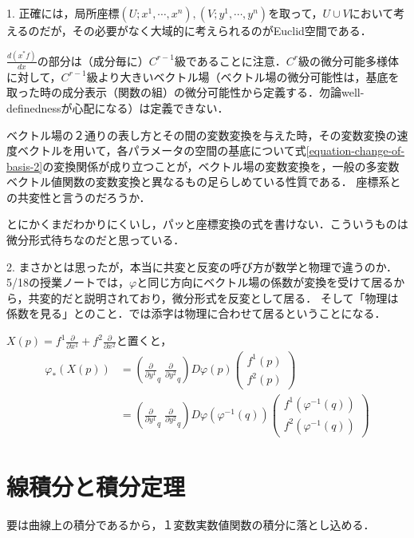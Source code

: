 \documentclass[uplatex, dvipdfmx]{jsreport}
\begin{document}
\begin{remark}
    1. 正確には，局所座標$(U;x^1,\cdots,x^n),(V;y^1,\cdots,y^n)$を取って，$U\cup V$において考えるのだが，その必要がなく大域的に考えられるのがEuclid空間である．

    $\frac{d(x^*f)}{dx}$の部分は（成分毎に）$C^{r-1}$級であることに注意．$C^r$級の微分可能多様体に対して，$C^{r-1}$級より大きいベクトル場（ベクトル場の微分可能性は，基底を取った時の成分表示（関数の組）の微分可能性から定義する．勿論well-definednessが心配になる）は定義できない．

    ベクトル場の２通りの表し方とその間の変数変換を与えた時，その変数変換の速度ベクトルを用いて，各パラメータの空間の基底について式\ref{equation-change-of-basis-2}の変換関係が成り立つことが，ベクトル場の変数変換を，一般の多変数ベクトル値関数の変数変換と異なるもの足らしめている性質である．
    座標系との共変性と言うのだろうか．

    とにかくまだわかりにくいし，パッと座標変換の式を書けない．こういうものは微分形式待ちなのだと思っている．

    2. まさかとは思ったが，本当に共変と反変の呼び方が数学と物理で違うのか．5/18の授業ノートでは，$\varphi$と同じ方向にベクトル場の係数が変換を受けて居るから，共変的だと説明されており，微分形式を反変として居る．
    そして「物理は係数を見る」とのこと．では添字は物理に合わせて居るということになる．

    $X(p)=f^1\frac{\partial}{\partial x^1}+f^2\frac{\partial}{\partial x^2}$と置くと，
    \begin{align*}
        \varphi_*(X(p)) &= \left( \frac{\partial}{\partial y^1}_q\;\frac{\partial}{\partial y^2}_q \right) D\varphi(p)\begin{pmatrix}f^1(p)\\f^2(p)\end{pmatrix} \\
        &= \left( \frac{\partial}{\partial y^1}_q\;\frac{\partial}{\partial y^2}_q \right) D\varphi(\varphi^{-1}(q))\begin{pmatrix}f^1(\varphi^{-1}(q))\\f^2(\varphi^{-1}(q))\end{pmatrix}
    \end{align*}
\end{remark}

\chapter{線積分と積分定理}
要は曲線上の積分であるから，１変数実数値関数の積分に落とし込める．
\end{document}
